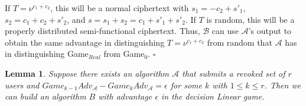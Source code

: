 \documentclass[a4paper, 11pt]{article}
\newtheorem{lemma}[theorem]{Lemma}
\newenvironment{proof}{\par\noindent{\bf Proof.}}{$\square$\par\bigskip}
\newtheorem{lemma}[theorem]{Lemma}
\theoremstyle{definition}
\begin{document}
\begin{proof}
If $T = \nu^{c_1+c_2}$, this will be a normal ciphertext with $s_1 = -c_2 + s'_1$, $s_2 = c_1 + c_2 + s'_2$, and $s = s_1 + s_2 = c_1 + s'_1+s'_2$. If $T$ is random, this will be a properly distributed semi-functional ciphertext. Thus, $\mathcal{B}$ can use $\mathcal{A}$'s output to obtain the same advantage in distinguishing $T = \nu^{c_1+c_2}$ from random that $\mathcal{A}$ has in distinguishing Game$_{Real}$ from Game$_{0}$.
\end{proof}

\begin{lemma} Suppose there exists an algorithm $\mathcal{A}$ that submits a revoked set of $r$ users and $Game_{k-1}Adv_{\mathcal{A}} - Game_k Adv_{\mathcal{A}} = \epsilon$ for some $k$ with $1 \leq k \leq r$. Then we can build an algorithm $B$ with advantage $\epsilon$ in the decision Linear game.
\end{lemma}
\end{document}
